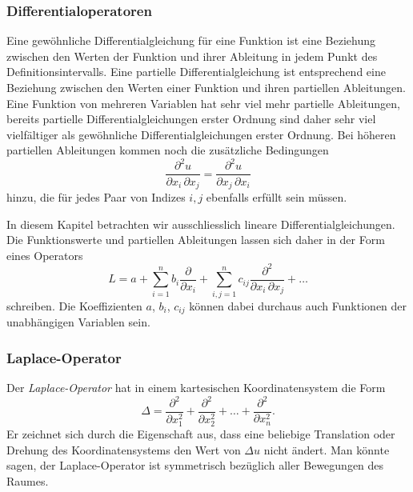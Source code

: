 \subsubsection{Differentialoperatoren}
Eine gewöhnliche Differentialgleichung für eine Funktion
ist eine Beziehung zwischen den Werten der Funktion und ihrer
Ableitung in jedem Punkt des Definitionsintervalls.
Eine partielle Differentialgleichung ist entsprechend eine
Beziehung zwischen den Werten einer Funktion und ihren partiellen
Ableitungen.
Eine Funktion von mehreren Variablen hat sehr viel mehr partielle
Ableitungen, bereits partielle Differentialgleichungen erster
Ordnung sind daher sehr viel vielfältiger als gewöhnliche
Differentialgleichungen erster Ordnung.
Bei höheren partiellen Ableitungen kommen noch die zusätzliche Bedingungen
\[
\frac{\partial^2 u}{\partial x_i\,\partial x_j}
=
\frac{\partial^2 u}{\partial x_j\,\partial x_i}
\]
hinzu, die für jedes Paar von Indizes $i,j$ ebenfalls erfüllt sein
müssen.

In diesem Kapitel betrachten wir ausschliesslich lineare
Differentialgleichungen.
Die Funktionswerte und partiellen Ableitungen lassen sich daher
in der Form eines Operators
\[
L 
=
a
+ \sum_{i=1}^n b_i \frac{\partial}{\partial x_i}
+ \sum_{i,j=1}^n c_{ij} \frac{\partial^2}{\partial x_i\,\partial x_j}
+ \dots
\]
schreiben.
Die Koeffizienten $a$, $b_i$, $c_{ij}$ können dabei durchaus auch
Funktionen der unabhängigen Variablen sein.

%
%
\subsubsection{Laplace-Operator}
Der {\em Laplace-Operator} hat in einem kartesischen Koordinatensystem die
Form
%
\[
\Delta
=
\frac{\partial^2}{\partial x_1^2}
+
\frac{\partial^2}{\partial x_2^2}
+
\dots
+
\frac{\partial^2}{\partial x_n^2}.
\]
Er zeichnet sich durch die Eigenschaft aus, dass eine beliebige 
Translation oder Drehung des Koordinatensystems den Wert von $\Delta u$
nicht ändert.
Man könnte sagen, der Laplace-Operator ist symmetrisch bezüglich
aller Bewegungen des Raumes.

%
%
